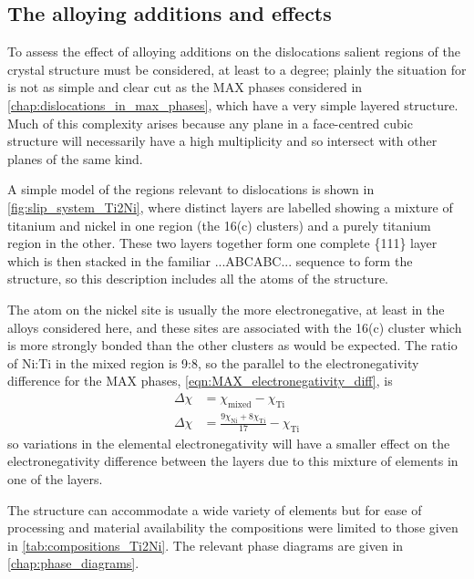 \subsection{The alloying additions and effects}

To assess the effect of alloying additions on the dislocations salient regions of the crystal structure must be considered, at least to a degree; plainly the situation for  is not as simple and clear cut as the MAX phases considered in \autoref{chap:dislocations_in_max_phases}, which have a very simple layered structure. Much of this complexity arises because any plane in a face-centred cubic structure will necessarily have a high multiplicity and so intersect with other planes of the same kind.

A simple model of the regions relevant to dislocations is shown in \autoref{fig:slip_system_Ti2Ni}, where distinct layers are labelled showing a mixture of titanium and nickel in one region (the 16(c) clusters) and a purely titanium region in the other. These two layers together form one complete \{111\} layer which is then stacked in the familiar ...ABCABC... sequence to form the structure, so this description includes all the atoms of the structure.

The atom on the nickel site is usually the more electronegative, at least in the alloys considered here, and these sites are associated with the 16(c) cluster which is more strongly bonded than the other clusters as would be expected. The ratio of Ni:Ti in the mixed region is 9:8, so the parallel to the electronegativity difference for the MAX phases, \autoref{eqn:MAX_electronegativity_diff}, is
\begin{align}
\Delta \chi &= \chi_{\text{mixed}} - \chi_{\text{Ti}} \nonumber\\
\Delta \chi &= \frac{9\chi_{\text{Ni}} + 8\chi_{\text{Ti}}}{17} - \chi_{\text{Ti}}
\end{align}
so variations in the elemental electronegativity will have a smaller effect on the electronegativity difference between the layers due to this mixture of elements in one of the layers.

The  structure can accommodate a wide variety of elements but for ease of processing and material availability the compositions were limited to those given in \autoref{tab:compositions_Ti2Ni}. The relevant phase diagrams are given in \autoref{chap:phase_diagrams}.

